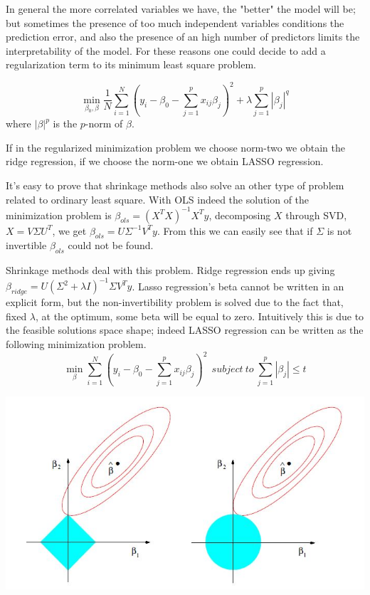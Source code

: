 \documentclass{article}%
\begin{document}
In general the more correlated variables we have, the "better" the model will be; but sometimes the presence of too much independent variables conditions the prediction error, and also the presence of an high number of predictors limits the interpretability of the model. For these reasons one could decide to add a regularization term to its minimum least square problem.

\[
\min_{\beta_0 , \beta} \frac{1}{N} \sum_{i=1}^N (y_i-\beta_0 - \sum_{j=1}^p x_{ij}\beta_j)^2 + \lambda\sum_{j=1}^p |\beta_j |^q 
\]
where $|\beta|^p$ is the $p$-norm of $\beta$.


If in the regularized minimization problem we choose norm-two we obtain the ridge regression, if we choose the norm-one we obtain LASSO regression. 


It's easy to prove that shrinkage methods also solve an other type of problem related to ordinary least square. With OLS indeed the solution of the minimization problem is $ \beta_{ols}=(X^TX)^{-1}X^Ty$, decomposing $X$ through SVD, $X=V\Sigma U^T$, we get $\beta_{ols}=U\Sigma^{-1}V^Ty$. From this we can easily see that if $\Sigma$ is not invertible $\beta_{ols}$ could not be found.


Shrinkage methods deal with this problem. Ridge regression ends up giving $\beta_{ridge}=U(\Sigma^2+\lambda I)^{-1} \Sigma V^T y$. Lasso regression's beta cannot be written in an explicit form, but the non-invertibility problem is solved due to the fact that, fixed $\lambda$, at the optimum, some beta will be equal to zero. Intuitively this is due to the feasible solutions space shape; indeed LASSO regression can be written as the following minimization problem.
\begin{equation}
 \min_{\beta} \sum_{i=1}^N ( y_i -\beta_0 -\sum_{j=1}^p x_{ij} \beta_j)^2 ~~subject~to~\sum_{j=1}^p |\beta_j| \leq t
\end{equation}

\includegraphics[scale=0.75]{lasso}
\end{document}
